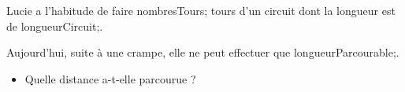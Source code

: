 \documentclass[exercice]{thedocument}%
\begin{document}
%
Lucie a l'habitude de faire \<nombresTours; tours d'un circuit dont la longueur
est de \<longueurCircuit;.\par
Aujourd'hui, suite à une crampe, elle ne peut effectuer que \<longueurParcourable;.
\begin{itemize}
    \item Quelle distance a-t-elle parcourue ?
\end{itemize}
\end{document}

